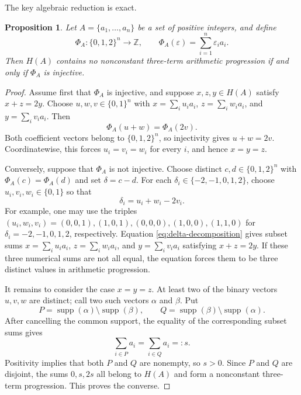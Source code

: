\documentclass[11pt]{article}
\numberwithin{equation}{section}
\newtheorem{proposition}[theorem]{Proposition}
\theoremstyle{definition}
\theoremstyle{remark}
\newcommand{\Z}{\mathbb{Z}}
\newcommand{\eps}{\varepsilon}
\begin{document}
The key algebraic reduction is exact.

\begin{proposition}\label{prop:ternary-equivalence}
Let $A=\{a_1,\ldots,a_n\}$ be a set of positive integers, and define
\begin{equation}\label{eq:ternary-map}
\Phi_A:\{0,1,2\}^n\longrightarrow\Z,
\qquad
\Phi_A(\eps)=\sum_{i=1}^n\eps_i a_i.
\end{equation}
Then $H(A)$ contains no nonconstant three-term arithmetic progression if and only if $\Phi_A$ is injective.
\end{proposition}

\begin{proof}
Assume first that $\Phi_A$ is injective, and suppose $x,z,y\in H(A)$ satisfy $x+z=2y$. Choose $u,w,v\in\{0,1\}^n$ with $x=\sum_i u_i a_i$, $z=\sum_i w_i a_i$, and $y=\sum_i v_i a_i$. Then
\[
\Phi_A(u+w)=\Phi_A(2v).
\]
Both coefficient vectors belong to $\{0,1,2\}^n$, so injectivity gives $u+w=2v$. Coordinatewise, this forces $u_i=v_i=w_i$ for every $i$, and hence $x=y=z$.

\bigskip
\noindent
Conversely, suppose that $\Phi_A$ is not injective. Choose distinct $c,d\in\{0,1,2\}^n$ with $\Phi_A(c)=\Phi_A(d)$ and set $\delta=c-d$. For each $\delta_i\in\{-2,-1,0,1,2\}$, choose $u_i,v_i,w_i\in\{0,1\}$ so that
\begin{equation}\label{eq:delta-decomposition}
\delta_i=u_i+w_i-2v_i.
\end{equation}
For example, one may use the triples $(u_i,w_i,v_i)=(0,0,1),(1,0,1),(0,0,0),(1,0,0),(1,1,0)$ for $\delta_i=-2,-1,0,1,2$, respectively. Equation \eqref{eq:delta-decomposition} gives subset sums $x=\sum_i u_i a_i$, $z=\sum_i w_i a_i$, and $y=\sum_i v_i a_i$ satisfying $x+z=2y$. If these three numerical sums are not all equal, the equation forces them to be three distinct values in arithmetic progression.

\bigskip
\noindent
It remains to consider the case $x=y=z$. At least two of the binary vectors $u,v,w$ are distinct; call two such vectors $\alpha$ and $\beta$. Put
\[
P=\operatorname{supp}(\alpha)\setminus\operatorname{supp}(\beta),
\qquad
Q=\operatorname{supp}(\beta)\setminus\operatorname{supp}(\alpha).
\]
After cancelling the common support, the equality of the corresponding subset sums gives
\[
\sum_{i\in P}a_i=\sum_{i\in Q}a_i=:s.
\]
Positivity implies that both $P$ and $Q$ are nonempty, so $s>0$. Since $P$ and $Q$ are disjoint, the sums $0,s,2s$ all belong to $H(A)$ and form a nonconstant three-term progression. This proves the converse.
\end{proof}
\end{document}
